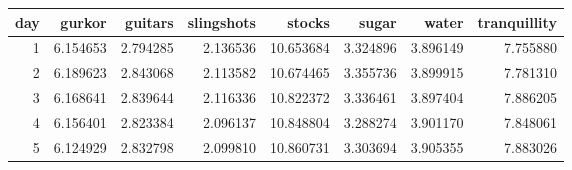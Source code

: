 \begin{tabular}{rrrrrrrr}
\toprule
day & gurkor & guitars & slingshots & stocks & sugar & water & tranquillity \\
\midrule
1 & 6.154653 & 2.794285 & 2.136536 & 10.653684 & 3.324896 & 3.896149 & 7.755880 \\
2 & 6.189623 & 2.843068 & 2.113582 & 10.674465 & 3.355736 & 3.899915 & 7.781310 \\
3 & 6.168641 & 2.839644 & 2.116336 & 10.822372 & 3.336461 & 3.897404 & 7.886205 \\
4 & 6.156401 & 2.823384 & 2.096137 & 10.848804 & 3.288274 & 3.901170 & 7.848061 \\
5 & 6.124929 & 2.832798 & 2.099810 & 10.860731 & 3.303694 & 3.905355 & 7.883026 \\
\bottomrule
\end{tabular}
